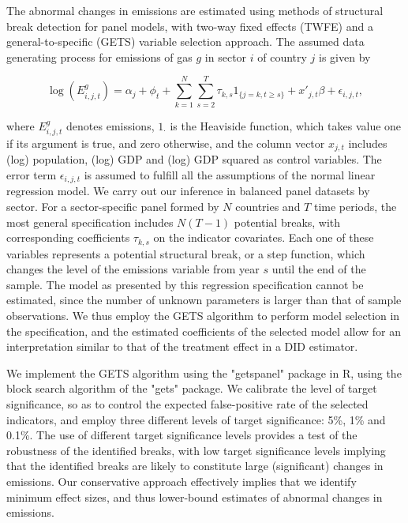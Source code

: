\documentclass[a4paper]{article}
\begin{document}
The abnormal changes in emissions are estimated using methods of structural break detection for panel models, with two-way fixed effects (TWFE) and a general-to-specific (GETS) variable selection approach. \cite{koch2022attributing,pretis2018automated,pretis2022discovering} The assumed data generating process for emissions of gas $g$ in sector $i$ of country $j$ is given by 

\begin{equation}
    \log(E^g_{i,j,t}) = \alpha_{j} + \phi_{t} + \sum_{k=1}^{N} \sum_{s=2}^{T} \tau_{k,s} 1_{\{j=k,t\ge s\}} + x'_{j,t}\beta + \epsilon_{i,j,t},
    \label{eq:general_model}
\end{equation}

where $E^g_{i,j,t}$ denotes emissions, 
$1_{\cdot}$ is the Heaviside function, which takes value one if its argument is true, and zero otherwise, and the column vector $x_{j,t}$ includes (log) population, (log) GDP and (log) GDP squared as control variables. The error term $\epsilon_{i,j,t}$ is assumed to fulfill all the assumptions of the normal linear regression model. We carry out our inference in balanced panel datasets by sector. For a sector-specific panel formed by $N$ countries and $T$ time periods, the most general specification includes $N(T-1)$ potential breaks, with corresponding coefficients $\tau_{k,s}$ on the indicator covariates. Each one of these variables represents a potential structural break, or a step function, which changes the level of the emissions variable from year $s$ until the end of the sample. The model as presented by this regression specification cannot be estimated, since the number of unknown parameters is larger than that of sample observations. We thus employ the GETS algorithm to perform model selection in the specification, \cite{pretis2022discovering} and the estimated coefficients of the selected model allow for an interpretation similar to that of the treatment effect in a DID estimator.

We implement the GETS algorithm using the "getspanel" package in R, \cite{getspanel} using the block search algorithm of the "gets" package.  \cite{pretis2018automated} We calibrate the level of target significance, so as to control the expected false-positive rate of the selected indicators, \cite{nielsen2018asymptotic} and employ three different levels of target significance: 5\%, 1\% and 0.1\%. The use of different target significance levels provides a test of the robustness of the identified breaks, with low target significance levels implying that the identified breaks are likely to constitute large (significant) changes in emissions. Our conservative approach effectively implies that we identify minimum effect sizes, and thus lower-bound estimates of abnormal changes in emissions.
\end{document}
